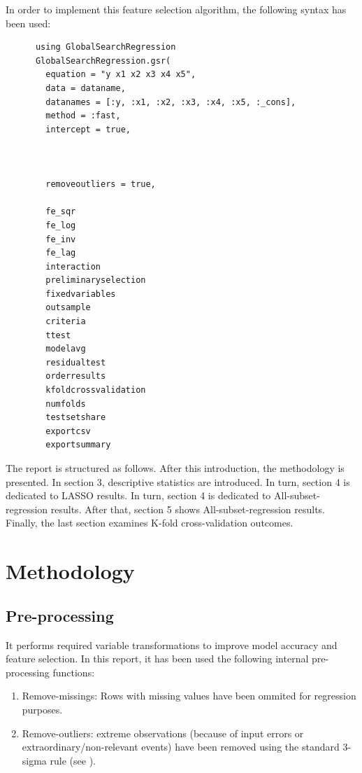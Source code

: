 \documentclass{article}
\begin{document}
In order to implement this feature selection algorithm, the following syntax has been used:

\begin{lstlisting} 
      using GlobalSearchRegression
      GlobalSearchRegression.gsr(
        equation = "y x1 x2 x3 x4 x5",
        data = dataname,
        datanames = [:y, :x1, :x2, :x3, :x4, :x5, :_cons],
        method = :fast,
        intercept = true,
        
        
        
        removeoutliers = true,

        fe_sqr
        fe_log
        fe_inv
        fe_lag
        interaction
        preliminaryselection
        fixedvariables
        outsample
        criteria
        ttest
        modelavg
        residualtest
        orderresults
        kfoldcrossvalidation
        numfolds
        testsetshare
        exportcsv
        exportsummary
\end{lstlisting}

The report is structured as follows. After this introduction, the methodology is presented. In section 3, descriptive statistics are introduced. In turn, section 4 is dedicated to LASSO results. In turn, section 4 is dedicated to All-subset-regression results. After that, section 5 shows All-subset-regression results. Finally, the last section examines K-fold cross-validation outcomes.

\section{Methodology}

\subsection{Pre-processing}
It performs required variable transformations to improve model accuracy and feature selection. In this report, it has been used the following internal pre-processing functions:

\begin{enumerate}
    \item Remove-missings: Rows with missing values have been ommited for regression purposes.
  


  \item Remove-outliers: extreme observations (because of input errors or extraordinary/non-relevant events) have been removed using the standard 3-sigma rule (see \cite{lehmann2013}).
\end{enumerate}
\end{document}

